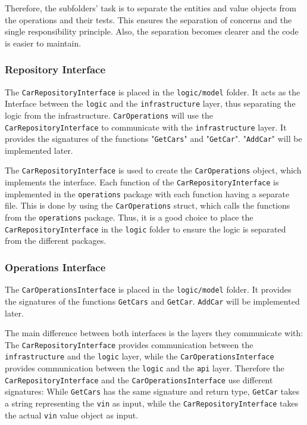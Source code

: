 Therefore, the subfolders' task is to separate the entities and value objects from the operations and their tests.
This ensures the separation of concerns and the single responsibility principle.
Also, the separation becomes clearer and the code is easier to maintain.

\subsubsection*{Repository Interface}
The \texttt{CarRepositoryInterface} is placed in the \texttt{logic/model} folder.
It acts as the Interface between the \texttt{logic} and the \texttt{infrastructure} layer, thus separating the logic from the infrastructure.
\texttt{CarOperations} will use the \texttt{CarRepositoryInterface} to communicate with the \texttt{infrastructure} layer.
It provides the signatures of the functions "\texttt{GetCars}" and "\texttt{GetCar}".
"\texttt{AddCar}" will be implemented later.

The \texttt{CarRepositoryInterface} is used to create the \texttt{CarOperations} object, which implements the interface.
Each function of the \texttt{CarRepositoryInterface} is implemented in the \texttt{operations} package with each function having a separate file.
This is done by using the \texttt{CarOperations} struct, which calls the functions from the \texttt{operations} package.
Thus, it is a good choice to place the \texttt{CarRepositoryInterface} in the \texttt{logic} folder to ensure the logic is separated from the different packages.

\subsubsection*{Operations Interface}
\label{sec:operationsInterface}
The \texttt{CarOperationsInterface} is placed in the \texttt{logic/model} folder.
It provides the signatures of the functions \texttt{GetCars} and \texttt{GetCar}.
\texttt{AddCar} will be implemented later.

The main difference between both interfaces is the layers they communicate with:
The \texttt{CarRepositoryInterface} provides communication between the \texttt{infrastructure} and the \texttt{logic} layer, while the \texttt{CarOperationsInterface} provides communication between the \texttt{logic} and the \texttt{api} layer.
Therefore the \texttt{CarRepositoryInterface} and the \texttt{CarOperationsInterface} use different signatures:
While \texttt{GetCars} has the same signature and return type, \texttt{GetCar} takes a string representing the \texttt{vin} as input, while the \texttt{CarRepositoryInterface} takes the actual \texttt{vin} value object as input.

